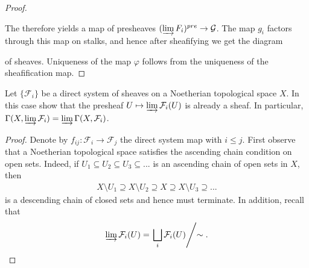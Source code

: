 \begin{problemset}
\begin{proof}
\begin{center}
		\end{center}
		The therefore yields a map of presheaves $(\varinjlim F_i)^{pre} \to \mathcal G$. The map $g_i$ factors through this map on stalks, and hence after sheafifying we get the diagram
		\begin{center}
		\end{center}
		of sheaves. Uniqueness of the map $\varphi$ follows from the uniqueness of the sheafification map. 
	\end{proof}
\item Let $\{\mathcal F_i\}$ be a direct system of sheaves on a Noetherian topological space $X$. In this case show that the presheaf $U\mapsto \varinjlim \mathcal F_i(U)$ is already a sheaf. In particular, $\Gamma(X,\varinjlim \mathcal F_i) = \varinjlim \Gamma(X,\mathcal F_i)$.
	\begin{proof}
		Denote by $f_{ij}:\mathcal F_i\to \mathcal F_j$ the direct system map with $i\leq j$. First observe that a Noetherian topological space satisfies the ascending chain condition on open sets. Indeed, if $U_1\subseteq U_2 \subseteq U_3 \subseteq ...$ is an ascending chain of open sets in $X$, then
		\begin{align*}
			X\setminus U_1 \supseteq X\setminus U_2 \supseteq X\supseteq X\setminus U_3 \supseteq ...
		\end{align*}
		is a descending chain of closed sets and hence must terminate. In addition, recall that
		\begin{align*}
			\varinjlim \mathcal F_i(U) = \left.\bigsqcup_{i}\mathcal F_i(U) \middle/ \sim\right. .
		\end{align*}


\end{proof}
\end{problemset}
